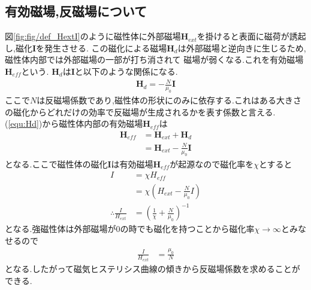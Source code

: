 \subsection{有効磁場,反磁場について}
図\ref{fig:fig/def_HextI}のように磁性体に外部磁場$\bm{H}_{ext}$を掛けると表面に磁荷が誘起し,磁化$\bm{I}$を発生させる.
この磁化による磁場$\bm{H}_d$は外部磁場と逆向きに生じるため,磁性体内部では外部磁場の一部が打ち消されて
磁場が弱くなる.これを有効磁場$\bm{H}_{eff}$という. $\bm{H}_d$は$\bm{I}$と以下のような関係になる.
\begin{align}
  \label{equ:Hd}
  \bm{H}_d=-\frac{N}{\mu_0}\bm{I}
\end{align}
ここで$N$は反磁場係数であり,磁性体の形状にのみに依存する.これはある大きさの磁化からどれだけの効率で反磁場が生成されるかを表す係数と言える.
(\ref{equ:Hd})から磁性体内部の有効磁場$\bm{H}_{eff}$は
\begin{align}
  \bm{H}_{eff}&=\bm{H}_{ext}+\bm{H}_d\nonumber\\
  &=\bm{H}_{ext}-\frac{N}{\mu_0}\bm{I}
\end{align}
となる.ここで磁性体の磁化$\bm{I}$は有効磁場$\bm{H}_{eff}$が起源なので磁化率を$\chi$とすると
\begin{align}
  \label{equ:IchiHeff}
  I&=\chi H_{eff}\nonumber\\
  &=\chi(H_{ext}-\frac{N}{\mu_0}I)\nonumber\\
  \therefore \frac{I}{H_{ext}}&=\left(\frac{1}{\chi}+\frac{N}{\mu_0}\right)^{-1}
\end{align}
となる.強磁性体は外部磁場が$0$の時でも磁化を持つことから磁化率$\chi\rightarrow\infty$とみなせるので
\begin{align}
  \frac{I}{H_{ext}}&=\frac{\mu_0}{N}
\end{align}
となる.したがって磁気ヒステリシス曲線の傾きから反磁場係数を求めることができる.
